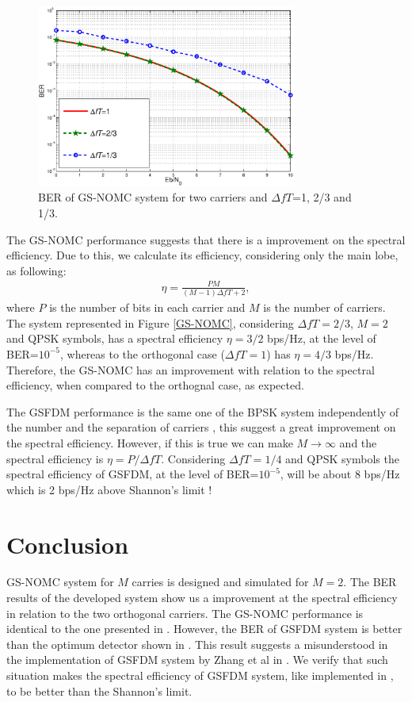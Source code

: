\documentclass[twocolumn]{el-author}
\begin{document}
\begin{figure}[H]
\begin{center}
\includegraphics[height=6cm]{fig1_IET2.eps}
\caption{BER of GS-NOMC system for two carriers and $\Delta fT$=1, 2/3 and 1/3.}
\label{BER}
\end{center}
\end{figure}

The GS-NOMC performance suggests that there is a improvement on the spectral efficiency. Due to this, we calculate its efficiency, considering only the main lobe, as following:
\begin{eqnarray}
\eta=\frac{PM}{(M-1)\Delta fT + 2}, \nonumber
\end{eqnarray}
where $P$ is the number of bits in each carrier and $M$ is the number of carriers. The system represented in Figure \ref{GS-NOMC}, considering $\Delta fT=2/3$, $M=2$ and QPSK symbols, has a spectral efficiency $\eta=3/2$ bps/Hz, at the level of BER=$10^{-5}$, whereas to the orthogonal case ($\Delta fT=1$) has $\eta=4/3$ bps/Hz. Therefore, the GS-NOMC has an improvement with relation to the spectral efficiency, when compared to the orthognal case, as expected.

The GSFDM performance is the same one of the BPSK system independently of the number and the separation of carriers \cite{Zhang}, this suggest a great improvement on the spectral efficiency. However, if this is true we can make $M \to \infty$ and the spectral efficiency is $\eta=P/\Delta fT$. Considering $\Delta fT=1/4$ and QPSK symbols the spectral efficiency of GSFDM, at the level of BER=$10^{-5}$,  will be about 8 bps/Hz which is 2 bps/Hz above Shannon's limit \cite{Proakis}!
\vspace{-5pt}
\section{Conclusion}

GS-NOMC system for $M$ carries is designed and simulated for $M=2$. The BER results of the developed system show us a improvement at the spectral efficiency in relation to the two orthogonal carriers. The GS-NOMC performance is identical to the one presented in \cite{Lucena}. However, the BER of GSFDM system is better than the optimum detector shown in \cite{Lucena}. This result suggests a misunderstood in the implementation of GSFDM system by Zhang et al in \cite{Zhang}. We verify that such situation makes the spectral efficiency  of GSFDM system, like implemented in \cite{Zhang},  to be better than the Shannon's limit. 
\end{document}
